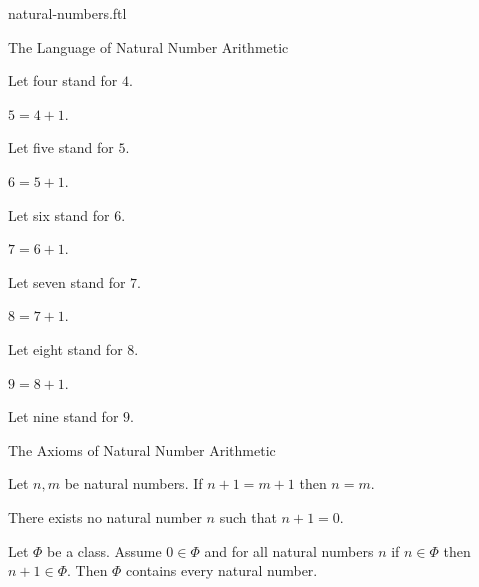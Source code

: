 \documentclass{naproche-library}
\begin{document}
\begin{smodule}[title=Natural Numbers]{natural-numbers.ftl}
\begin{sfragment}{The Language of Natural Number Arithmetic}
\begin{definition}[forthel,id=ARITHMETIC_01_1709884968009728]
    Let four stand for $4$.
  \end{definition}

  \begin{definition}[forthel,id=ARITHMETIC_01_6734726333202432]
    $5 = 4 + 1$.

    Let five stand for $5$.
  \end{definition}

  \begin{definition}[forthel,id=ARITHMETIC_01_949139189792768]
    $6 = 5 + 1$.

    Let six stand for $6$.
  \end{definition}

  \begin{definition}[forthel,id=ARITHMETIC_01_7245471749767168]
    $7 = 6 + 1$.

    Let seven stand for $7$.
  \end{definition}

  \begin{definition}[forthel,id=ARITHMETIC_01_5658172888973312]
    $8 = 7 + 1$.

    Let eight stand for $8$.
  \end{definition}

  \begin{definition}[forthel,id=ARITHMETIC_01_7371844250238976]
    $9 = 8 + 1$.

    Let nine stand for $9$.
  \end{definition}
\end{sfragment}

\begin{sfragment}{The Axioms of Natural Number Arithmetic}
  \begin{axiom}[forthel,id=ARITHMETIC_01_3604163883696128]
    Let $n, m$ be natural numbers.
    If $n + 1 = m + 1$ then $n = m$.
  \end{axiom}

  \begin{axiom}[forthel,id=ARITHMETIC_01_4454289938317312]
    There exists no natural number $n$ such that $n + 1 = 0$.
  \end{axiom}

  \begin{axiom}[forthel,title=Induction,id=ARITHMETIC_01_4764664342773760]
    Let $\Phi$ be a class.
    Assume $0 \in \Phi$ and for all natural numbers $n$ if $n \in \Phi$ then
    $n + 1 \in \Phi$.
    Then $\Phi$ contains every natural number.
  \end{axiom}


\end{sfragment}
\end{smodule}
\end{document}
